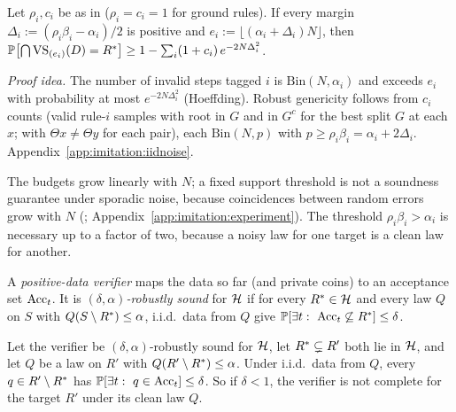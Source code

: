 \begin{theorem}\label{thm:imitation:iidnoise}
Let $\rho_i,c_i$ be as in  ($\rho_i=c_i=1$ for ground rules). If every margin $\Delta_i:=(\rho_i\beta_i-\alpha_i)/2$ is positive and $e_i:=\lfloor(\alpha_i+\Delta_i)N\rfloor$, then
$\mathbb{P}\bigl[\bigcap\mathrm{VS}_{(e_i)}(D)=R^{*}\bigr]\ge1-\sum_i(1+c_i)\,e^{-2N\Delta_i^2}$.
\end{theorem}

\noindent\emph{Proof idea.} The number of invalid steps tagged $i$ is $\mathrm{Bin}(N,\alpha_i)$ and exceeds $e_i$ with probability at most $e^{-2N\Delta_i^2}$ (Hoeffding). Robust genericity follows from $c_i$ counts (valid rule-$i$ samples with root in $G$ and in $G^c$ for the best split $G$ at each $x$; with $\Theta x\neq\Theta y$ for each pair), each $\mathrm{Bin}(N,p)$ with $p\ge\rho_i\beta_i=\alpha_i+2\Delta_i$. Appendix~\ref{app:imitation:iidnoise}.

The budgets grow linearly with $N$; a fixed support threshold is not a soundness guarantee under sporadic noise, because coincidences between random errors grow with $N$ (; Appendix~\ref{app:imitation:experiment}). The threshold $\rho_i\beta_i>\alpha_i$ is necessary up to a factor of two, because a noisy law for one target is a clean law for another.

\begin{definition}\label{def:imitation:robust}
A \emph{positive-data verifier} maps the data so far (and private coins) to an acceptance set $\mathrm{Acc}_t$. It is \emph{$(\delta,\alpha)$-robustly sound} for $\mathcal{H}$ if for every $R^{*}\in\mathcal{H}$ and every law $Q$ on $S$ with $Q(S\setminus R^{*})\le\alpha$, i.i.d.\ data from $Q$ give $\Prob[\exists t:\ \Acc_t\not\subseteq\Rstar]\le\delta$.
\end{definition}

\begin{theorem}\label{thm:imitation:indist}
Let the verifier be $(\delta,\alpha)$-robustly sound for $\mathcal{H}$, let $R^{*}\subsetneq R'$ both lie in $\mathcal{H}$, and let $Q$ be a law on $R'$ with $Q(R'\setminus R^{*})\le\alpha$. Under i.i.d.\ data from $Q$, every $q\in R'\setminus R^{*}$ has $\Prob[\exists t:\ q\in\Acc_t]\le\delta$. So if $\delta<1$, the verifier is not complete for the target $R'$ under its clean law $Q$.
\end{theorem}

